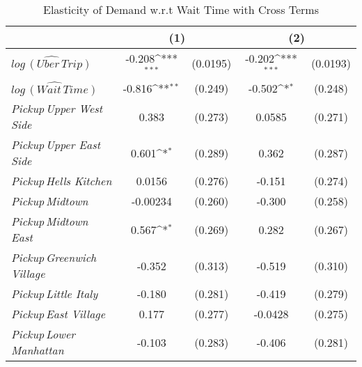 \begin{table}[h]
\caption{Elasticity of Demand w.r.t Wait Time with Cross Terms}\label{tab:lnwaittime_uber_cross}\\


{
\def\sym#1{\ifmmode^{#1}\else\(^{#1}\)\fi}
\begin{center}
\begin{tabular}{l*{2}{cc}}
\hline\hline
            &\multicolumn{2}{c}{(1)}           &\multicolumn{2}{c}{(2)}           \\
\hline
${\widehat{log\, (Uber\,Trip)}}$  &      -0.208\sym{***}&    (0.0195)&      -0.202\sym{***}&    (0.0193)\\
${\widehat{log\, (Wait\, Time)}}$&      -0.816\sym{**} &     (0.249)&      -0.502\sym{*}  &     (0.248)\\
\hspace{3cm}\textit{Pickup\,Upper West Side}&       0.383         &     (0.273)&      0.0585         &     (0.271)\\
\hspace{3cm}\textit{Pickup\,Upper East Side}&       0.601\sym{*}  &     (0.289)&       0.362         &     (0.287)\\
\hspace{3cm}\textit{Pickup\,Hells Kitchen}&      0.0156         &     (0.276)&      -0.151         &     (0.274)\\
\hspace{3cm}\textit{Pickup\,Midtown}&    -0.00234         &     (0.260)&      -0.300         &     (0.258)\\
\hspace{3cm}\textit{Pickup\,Midtown East}&       0.567\sym{*}  &     (0.269)&       0.282         &     (0.267)\\
\hspace{3cm}\textit{Pickup\,Greenwich Village}&      -0.352         &     (0.313)&      -0.519         &     (0.310)\\
\hspace{3cm}\textit{Pickup\,Little Italy}&      -0.180         &     (0.281)&      -0.419         &     (0.279)\\
\hspace{3cm}\textit{Pickup\,East Village}&       0.177         &     (0.277)&     -0.0428         &     (0.275)\\
\hspace{3cm}\textit{Pickup\,Lower Manhattan}&      -0.103         &     (0.283)&      -0.406         &     (0.281)\\
\hline

\end{tabular}
\end{center}}
\end{table}
